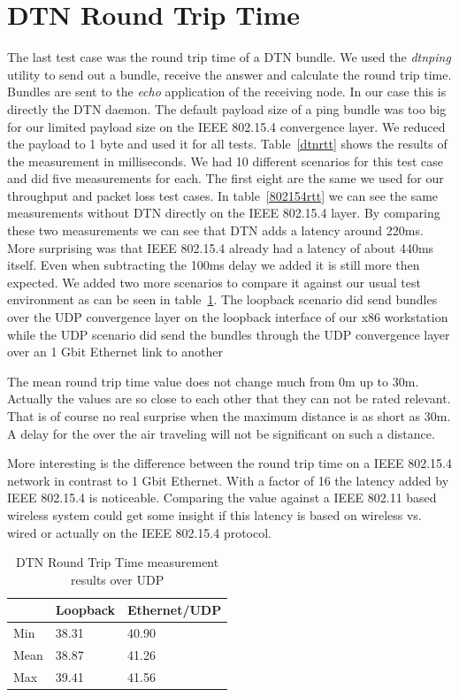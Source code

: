\section{DTN Round Trip Time}
The last test case was the round trip time of a DTN bundle. We used the
\emph{dtnping} utility to send out a bundle, receive the answer and calculate
the round trip time. Bundles are sent to the \emph{echo} application of the
receiving node. In our case this is directly the DTN daemon. The default payload
size of a ping bundle was too big for our limited payload size on the IEEE
802.15.4 convergence layer. We reduced the payload to 1 byte and used it for all
tests. Table~\ref{dtnrtt} shows the results of the measurement in milliseconds. We
had 10 different scenarios for this test case and did five measurements for each.
The first eight are the same we used for our throughput and packet loss test cases.
In table~\ref{802154rtt} we can see the same measurements without DTN directly on
the IEEE 802.15.4 layer. By comparing these two measurements we can see that DTN
adds a latency around 220ms. More surprising was that IEEE 802.15.4 already had
a latency of about 440ms itself. Even when subtracting the 100ms delay we added
it is still more then expected. We added two more scenarios to compare it against
our usual test environment as can be seen in table~\ref{dtnrtt2}. The
loopback scenario did send bundles over the UDP convergence layer on the loopback
interface of our x86 workstation while the UDP scenario did send the bundles
through the UDP convergence layer over an 1 Gbit Ethernet link to another

The mean round trip time value does not change much from 0m up to 30m. Actually
the values are so close to each other that they can not be rated relevant. That
is of course no real surprise when the maximum distance is as short as 30m. A
delay for the over the air traveling will not be significant on such a distance.

More interesting is the difference between the round trip time on a IEEE
802.15.4 network in contrast to 1 Gbit Ethernet. With a factor of 16 the latency
added by IEEE 802.15.4 is noticeable. Comparing the value against a
IEEE 802.11 based wireless system could get some insight if this latency is based
on wireless vs. wired or actually on the IEEE 802.15.4 protocol.

\begin{table}
\begin{tabular}{lll}
    & Loopback & Ethernet/UDP \\
\hline
Min & 38.31 & 40.90 \\
Mean & 38.87 & 41.26 \\
Max & 39.41 & 41.56 \\
\end{tabular}
\caption{DTN Round Trip Time measurement results over UDP}
\label{dtnrtt2}
\end{table}

